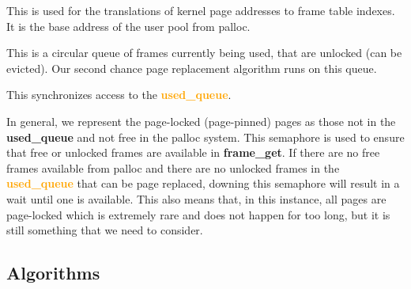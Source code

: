 \documentclass{report}
\newcommand{\fun}[1]{\textcolor{Emerald}{\textbf{#1}}}
\newcommand{\file}[1]{\textcolor{YellowGreen}{\textbf{#1}}}
\newcommand{\struct}[1]{\textcolor{orange}{\textbf{#1}}}
\newcommand{\var}[1]{\textcolor{RoyalPurple}{\textbf{#1}}}
\newcommand{\pintoscode}[4]{}
\newcommand{\pintosfile}[3]{\pintoscode{#1}{#2}{\file{#3}}{#3}}
\begin{document}
				\pintosfile{41}{41}{frame.c}
				This is used for the translations of kernel page addresses to frame 
				table indexes. It is the base address of the user pool from palloc.
				
				\pintosfile{53}{53}{frame.c}
				This is a circular queue of frames currently being used, that are 
				unlocked (can	be evicted). Our second chance page replacement algorithm 
				runs on this queue.

				\pintosfile{44}{44}{frame.c}
				This synchronizes access to the \struct{used\_queue}.

				\pintosfile{50}{50}{frame.c}
				In general, we represent the page-locked (page-pinned) pages as those
				not in the \var{used\_queue} and not free in the palloc system.
				This semaphore is used to ensure that free or unlocked frames are available in \fun{frame\_get}.
				If there are no free frames available from palloc and there
				are no unlocked frames in the \struct{used\_queue} that can be page replaced,
				downing this semaphore will result in a wait until one is available. This
				also means that, in this instance, all pages are page-locked which is extremely rare and does not
				happen for too long, but it is still something that we need to consider.
				

		\subsection*{Algorithms}
\end{document}
